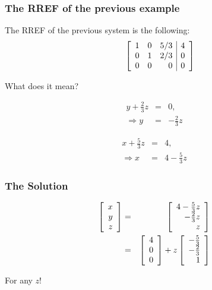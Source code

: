 \begin{frame}
  \frametitle{The RREF of the previous example}

  The RREF of the previous system is the following:
  \begin{eqnarray*}
    \stateThree{~}{~}{~}
    \startRowOps
    \oneRowOps{1}{0}{5/3}{4}
    \oneRowOps{0}{1}{2/3}{0}
    \oneRowOps{0}{0}{0}{0}
    \stopRowOps
  \end{eqnarray*}

  What does it mean?

  \begin{eqnarray*}
    y + \frac{2}{3}z & = & 0, \\
    \Rightarrow y & = & -\frac{2}{3} z
  \end{eqnarray*}

  {
    \begin{eqnarray*}
      x + \frac{5}{3} z & = & 4, \\
      \Rightarrow x & = & 4 - \frac{5}{3} z
    \end{eqnarray*}
  }

\end{frame}

\begin{frame}
  \frametitle{The Solution}

  \begin{eqnarray*}
    \left[ \begin{array}{r} x \\ y \\ z \end{array} \right] & = & \left[ \begin{array}{r} 4 - \frac{5}{3}z \\ -\frac{2}{3}z \\ z \end{array} \right] \\
    & = & \left[ \begin{array}{r} 4 \\ 0 \\ 0 \end{array} \right] + z \left[ \begin{array}{r} -\frac{5}{3} \\ -\frac{2}{3} \\ 1 \end{array} \right]
  \end{eqnarray*}

  For any $z$!

\end{frame}


